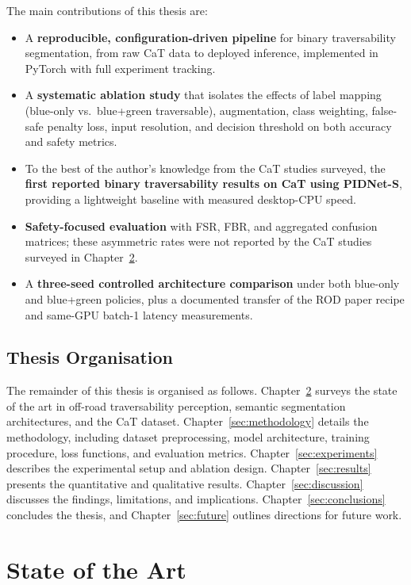 \documentclass[12pt,a4paper]{report}
\begin{document}
The main contributions of this thesis are:
\begin{itemize}[nosep]
  \item A \textbf{reproducible, configuration-driven pipeline} for binary traversability segmentation, from raw CaT data to deployed inference, implemented in PyTorch with full experiment tracking.
  \item A \textbf{systematic ablation study} that isolates the effects of label mapping (blue-only vs.\ blue+green traversable), augmentation, class weighting, false-safe penalty loss, input resolution, and decision threshold on both accuracy and safety metrics.
  \item To the best of the author's knowledge from the CaT studies surveyed,
  the \textbf{first reported binary traversability results on CaT using
  PIDNet-S}, providing a lightweight baseline with measured desktop-CPU speed.
  \item \textbf{Safety-focused evaluation} with FSR, FBR, and aggregated
  confusion matrices; these asymmetric rates were not reported by the CaT
  studies surveyed in Chapter~\ref{sec:sota}.
  \item A \textbf{three-seed controlled architecture comparison} under both
  blue-only and blue+green policies, plus a documented transfer of the ROD
  paper recipe and same-GPU batch-1 latency measurements.
\end{itemize}

\section{Thesis Organisation}

The remainder of this thesis is organised as follows.
Chapter~\ref{sec:sota} surveys the state of the art in off-road traversability perception, semantic segmentation architectures, and the CaT dataset.
Chapter~\ref{sec:methodology} details the methodology, including dataset preprocessing, model architecture, training procedure, loss functions, and evaluation metrics.
Chapter~\ref{sec:experiments} describes the experimental setup and ablation design.
Chapter~\ref{sec:results} presents the quantitative and qualitative results.
Chapter~\ref{sec:discussion} discusses the findings, limitations, and implications.
Chapter~\ref{sec:conclusions} concludes the thesis, and Chapter~\ref{sec:future} outlines directions for future work.


\chapter{State of the Art}
\label{sec:sota}
\end{document}
